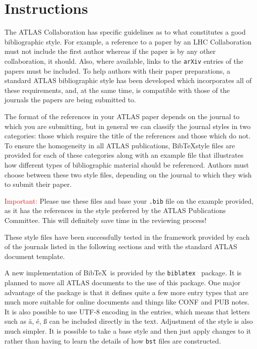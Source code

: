 \documentclass{style/atlasdoc}
\author{Ian C. Brock}
\newcommand*{\BibTeX}{Bib\TeX}
\begin{document}
 

\maketitle

\section{Instructions}

The ATLAS Collaboration has specific guidelines as to what constitutes a good bibliographic style. 
For example, a reference to a paper by an LHC Collaboration must not include the first author whereas if the paper is by any other collaboration, it should. 
Also, where available, links to the \texttt{arXiv} entries of the papers must be included. 
To help authors with their paper preparations, a standard ATLAS bibliographic style has been developed which incorporates all of these requirements, 
and, at the same time, is compatible with those of the journals the papers are being submitted to. 

The format of the references in your ATLAS paper depends on the journal to which you are submitting,
but in general we can classify the journal styles in two categories: those which require the title of the references and those which do not. 
To ensure the homogeneity in all ATLAS publications, 
\BibTeX style files are provided for each of these categories along with an example file that illustrates how different types of bibliographic material should be referenced.
Authors must choose between these two style files, depending on the journal to which they wish to submit their paper.

\textcolor{red}{Important:} Please use these files and base your \texttt{.bib} file on the example provided,
as it has the references in the style preferred by the ATLAS Publications Committee.
This will definitely save time in the reviewing process!

These style files have been successfully tested in the framework provided by each of the journals listed in the following sections and with the standard ATLAS document template.

A new implementation of \BibTeX\ is provided by the \texttt{biblatex}~\cite{biblatex} package.
It is planned to move all ATLAS documents to the use of this package.
One major advantage of the package is that it defines quite a few more entry types
that are much more suitable for online documents and things like CONF and PUB notes.
It is also possible to use UTF-8 encoding in the entries, which means that letters such as
ä, é, ß can be included directly in the text.
Adjustment of the style is also much simpler.
It is possible to take a base style and then just apply changes to it rather than
having to learn the details of how \texttt{bst} files are constructed.
\end{document}
